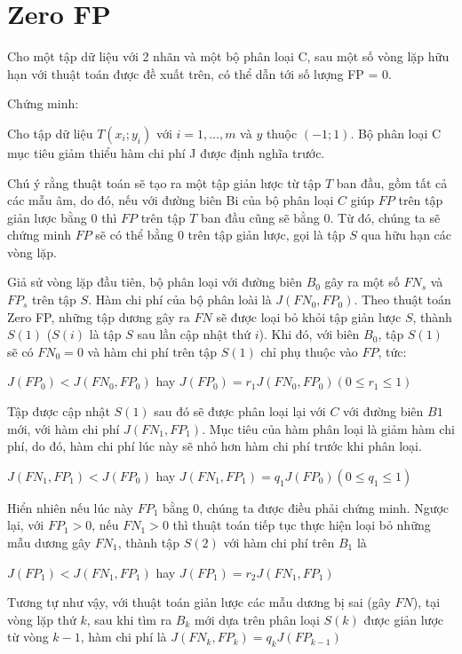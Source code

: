 \documentclass[./../main.tex]{subfiles}
\begin{document}
\section{Zero FP}
Cho một tập dữ liệu với 2 nhãn và một bộ phân loại C, sau một số vòng lặp hữu hạn với thuật toán được đề xuất trên, có thể dẫn tới số lượng FP = 0.

Chứng minh:

Cho tập dữ liệu $T (x_i;y_i)$ với $i=1,\ldots,m$ và $y$ thuộc $(-1;1)$. Bộ phân loại C mục tiêu giảm thiểu hàm chi phí J được định nghĩa trước.


Chú ý rằng thuật toán sẽ tạo ra một tập giản lược từ tập $T$ ban đầu, gồm tất cả các mẫu âm, do đó, nếu với đường biên Bi của bộ phân loại $C$ giúp $FP$ trên tập giản lược bằng 0 thì $FP$ trên tập $T$ ban đầu cũng sẽ bằng 0. Từ đó, chúng ta sẽ chứng minh $FP$ sẽ có thể bằng $0$ trên tập giản lược, gọi là tập $S$ qua hữu hạn các vòng lặp.


Giả sử vòng lặp đầu tiên, bộ phân loại với đường biên $B_0$ gây ra một số $FN_s$ và $FP_s$ trên tập $S$. Hàm chi phí của bộ phân loài là $J(FN_0,FP_0)$. Theo thuật toán Zero FP, những tập dương gây ra $FN $ sẽ được loại bỏ khỏi tập giản lược $S$, thành $S(1)$ ($S(i)$ là tập $S$ sau lần cập nhật thứ $i$). Khi đó, với biên $B_0$, tập $S(1)$ sẽ có $FN_0 = 0$ và hàm chi phí trên tập $S(1)$ chỉ phụ thuộc vào $FP$, tức:

$J(FP_0) < J(FN_0, FP_0)$ hay $J(FP_0) = r_1 J(FN_0, FP_0) ( 0 \leq r_1 \leq 1)$

Tập được cập nhật $S(1)$ sau đó sẽ được phân loại lại với $C$ với đường biên $B1$ mới, với hàm chi phí $J(FN_1, FP_1)$. Mục tiêu của hàm phân loại là giảm hàm chi phí, do đó, hàm chi phí lúc này sẽ nhỏ hơn hàm chi phí trước khi phân loại.


$J(FN_1, FP_1) < J(FP_0)$ hay $J(FN_1, FP_1) = q_1 J(FP_0) (0 \leq q_1 \leq 1)$

Hiển nhiên nếu lúc này $FP_1$ bằng 0, chúng ta được điều phải chứng minh. Ngược lại, với $FP_1 >0$, nếu $FN_1 > 0$ thì thuật toán tiếp tục thực hiện loại bỏ những mẫu dương gây $FN_1$, thành tập $S(2)$ với hàm chi phí trên $B_1$ là


$J(FP_1) < J(FN_1, FP_1)$ hay $J(FP_1) = r_2 J(FN_1,FP_1)$

Tương tự như vậy, với thuật toán giản lược các mẫu dương bị sai (gây $FN$), tại vòng lặp thứ $k$, sau khi tìm ra $B_k$ mới dựa trên phân loại $S(k)$ được giản lược từ vòng $k-1$, hàm chi phí là $J(FN_k, FP_k) = q_k J(FP_{k-1})$
\end{document}
